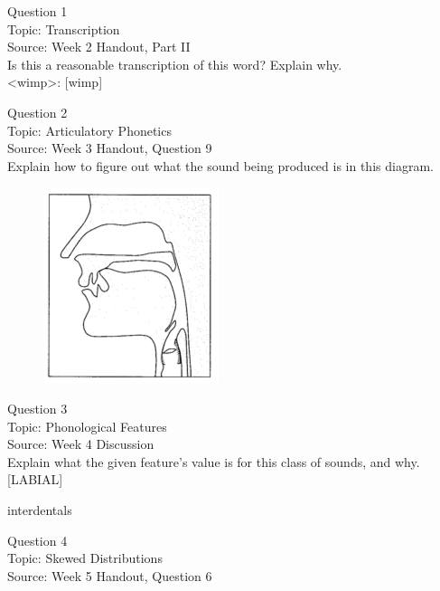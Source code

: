 \documentclass[12pt]{article}
\begin{document}
{\large Question 1}\\

Topic: Transcription\\
Source: Week 2 Handout, Part II\\

Is this a reasonable transcription of this word? Explain why.\\

<wimp>: {[wimp]}


\newpage

{\large Question 2}\\

Topic: Articulatory Phonetics\\
Source: Week 3 Handout, Question 9\\

Explain how to figure out what the sound being produced is in this diagram.\\

\begin{figure}[H]
\includegraphics{../images/sagittal_t.png}
\end{figure}

\newpage

{\large Question 3}\\

Topic: Phonological Features\\
Source: Week 4 Discussion\\

Explain what the given feature’s value is for this class of sounds, and why.\\

{[LABIAL]}

interdentals


\newpage

{\large Question 4}\\

Topic: Skewed Distributions\\
Source: Week 5 Handout, Question 6\\
\end{document}
